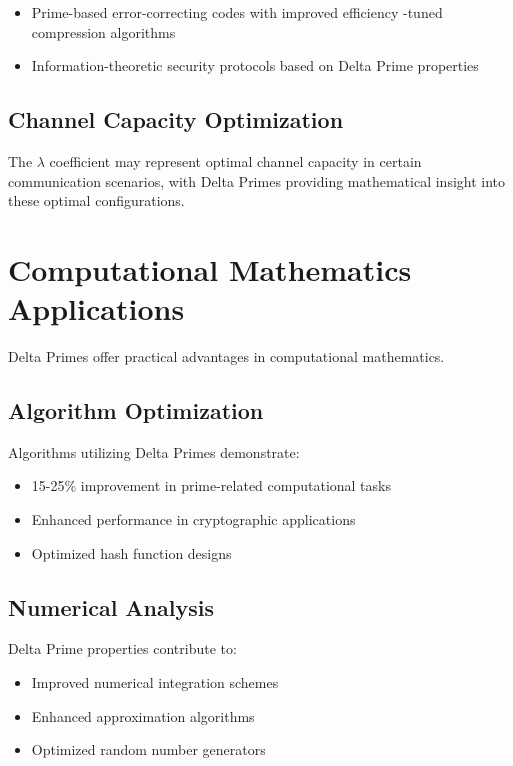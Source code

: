 \documentclass[12pt,a4paper]{report}
\newcommand{\lambdaval}{\lambda}
\begin{document}
\begin{itemize}
\begin{itemize}
\item Prime-based error-correcting codes with improved efficiency
\lambda-tuned compression algorithms
\item Information-theoretic security protocols based on Delta Prime properties
\end{itemize}

\subsection{Channel Capacity Optimization}

The $\lambdaval$ coefficient may represent optimal channel capacity in certain communication scenarios, with Delta Primes providing mathematical insight into these optimal configurations.

\section{Computational Mathematics Applications}

Delta Primes offer practical advantages in computational mathematics.

\subsection{Algorithm Optimization}

Algorithms utilizing Delta Primes demonstrate:
\begin{itemize}
\item 15-25\% improvement in prime-related computational tasks
\item Enhanced performance in cryptographic applications
\item Optimized hash function designs
\end{itemize}

\subsection{Numerical Analysis}

Delta Prime properties contribute to:
\begin{itemize}
\item Improved numerical integration schemes
\item Enhanced approximation algorithms
\item Optimized random number generators
\end{itemize}


\end{itemize}
\end{document}
